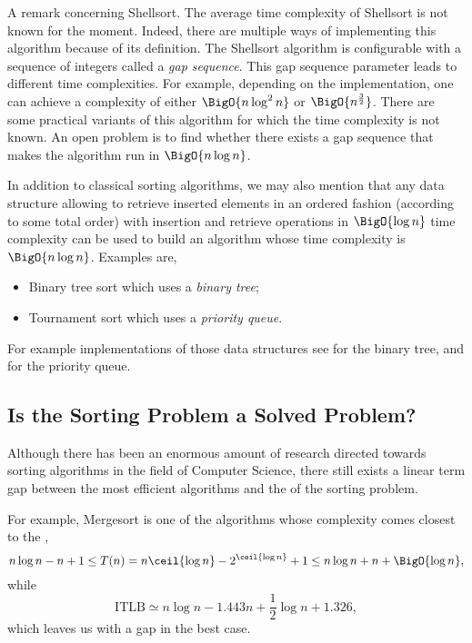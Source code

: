 A remark concerning Shellsort. The average time complexity of Shellsort is not
known for the moment. Indeed, there are multiple ways of implementing this
algorithm because of its definition. The Shellsort algorithm is configurable
with a sequence of integers called a \emph{gap sequence}. This gap sequence
parameter leads to different time complexities. For example, depending on the
implementation, one can achieve a complexity of either $\BigO{n \log^2 n}$ or
$\BigO{n^{\frac{3}{2}}}$. There are some practical variants of this algorithm
for which the time complexity is not known. An open problem is to find whether
there exists a gap sequence that makes the algorithm run in $\BigO{n \log
n}$.

In addition to classical sorting algorithms, we may also mention that any data
structure allowing to retrieve inserted elements in an ordered fashion
(according to some total order) with insertion and retrieve operations in
$\BigO{\log n}$ time complexity can be used to build an algorithm whose time
complexity is $\BigO{n \log n}$. Examples are,

\begin{itemize}
\item Binary tree sort which uses a \emph{binary tree};
\item Tournament sort which uses a \emph{priority queue}.
\end{itemize}

For example implementations of those data structures see
\citet*{sleator:1985} for the binary tree, and
\citet*{leiserson:2001} for the priority queue.


\subsection*{Is the Sorting Problem a Solved Problem?}

Although there has been an enormous amount of research directed towards sorting
algorithms in the field of Computer Science, there still exists a linear term
gap between the most efficient algorithms and the  of the
sorting problem.

For example, Mergesort is one of the algorithms whose complexity comes closest
to the , \ie
\begin{displaymath}
n \log n - n + 1 \le T(n) = n \ceil{\log n} - 2^{\ceil{\log n}} + 1 \le n \log
n + n + \BigO{\log n},
\end{displaymath}
while
\begin{displaymath}
\text{ITLB} \simeq n \log n - 1.443 n + \frac{1}{2} \log n + 1.326,
\end{displaymath}
which leaves us with a  gap in the best case.
